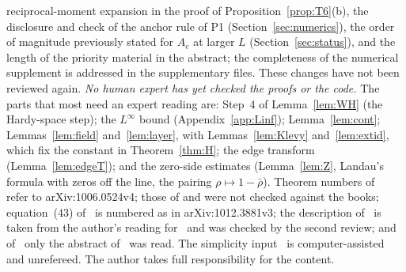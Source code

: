 \documentclass[11pt]{amsart}
\theoremstyle{definition}
\theoremstyle{remark}
\numberwithin{equation}{section}
\begin{document}
reciprocal-moment expansion in the proof of Proposition~\ref{prop:T6}(b), the disclosure and check of the anchor rule of P1 (Section~\ref{sec:numerics}), the order of magnitude previously stated for $A_e$ at larger $L$ (Section~\ref{sec:status}), and the length of the priority material in the abstract; the completeness of the numerical supplement is addressed in the supplementary files. These changes have not been reviewed again. \emph{No human expert has yet checked the proofs or the code.} The parts that most need an expert reading are: Step~4 of Lemma~\ref{lem:WH} (the Hardy-space step); the $L^\infty$ bound (Appendix~\ref{app:Linf}); Lemma~\ref{lem:cont}; Lemmas~\ref{lem:field} and~\ref{lem:layer}, with Lemmas~\ref{lem:Klevy} and~\ref{lem:extid}, which fix the constant in Theorem~\ref{thm:H}; the edge transform (Lemma~\ref{lem:edgeT}); and the zero-side estimates (Lemma~\ref{lem:Z}, Landau's formula with zeros off the line, the pairing $\rho\mapsto1-\bar\rho$). Theorem numbers of~\cite{Kw11} refer to arXiv:1006.0524v4; those of \cite[Thms.~5.2, 6.2]{SSV12} and \cite[Thm.~VI.20]{Bertoin96} were not checked against the books; equation~(43) of~\cite{BK17} is numbered as in arXiv:1012.3881v3; the description of~\cite{KW26} is taken from the author's reading for~\cite{BPL} and was checked by the second review; and of~\cite{VS23,VS26} only the abstract of~\cite{VS23} was read. The simplicity input~\cite{GS} is computer-assisted and unrefereed. The author takes full responsibility for the content.
\end{document}
